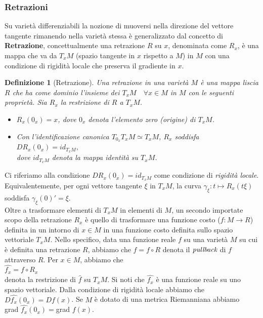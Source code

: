 \documentclass[a4paper, 12pt]{article}
\newtheorem{definition}{Definizione}
\begin{document}
\subsubsection{Retrazioni}
Su varietà differenziabili la nozione di muoversi nella direzione del vettore tangente rimanendo nella varietà stessa è generalizzato dal concetto di \textbf{Retrazione}, concettualmente una retrazione $R$ su $x$, denominata come $R_x$, è una mappa che va da $T_xM$ (spazio tangente in $x$ rispetto a $M$) in $M$ con una condizione di rigidità locale che preserva il gradiente in $x$.
\begin{definition}[Retrazione]
Una retrazione in una varietà $M$ è una mappa liscia $R$ che ha come dominio l'insieme dei $T_xM \quad \forall x \in M$ in $M$ con le seguenti proprietà. Sia $R_x$ la restrizione di $R$ a $T_xM$.
\begin{itemize}
  \item $R_x(0_x) = x$, dove $0_x$ denota l'elemento zero (origine) di $T_xM$.
  \item Con l'identificazione canonica $T_{0_x} T_xM \simeq T_xM$, $R_x$ soddisfa\\
  $DR_x(0_x) = id_{T_xM},$\\
  dove $id_{T_xM}$ denota la mappa identità su $T_xM$.
\end{itemize}
\end{definition}
Ci riferiamo alla condizione $DR_x(0_x) = id_{T_xM}$ come condizione di \emph{rigidità locale}. Equivalentemente, per ogni vettore tangente $\xi$ in $T_xM$, la curva $\gamma_{\xi}:t \mapsto R_x(t\xi)$ soddisfa $\gamma_{\xi}(0)' = \xi$.\\
Oltre a trasformare elementi di $T_xM$ in elementi di $M$, un secondo importate scopo della retrazione $R_x$ è quello di trasformare una funzione costo ($f:M \to R$) definita in un intorno di $x \in M$ in una funzione costo definita sullo spazio vettoriale $T_xM$. Nello specifico, data una funzione reale $f$ su una varietà $M$ su cui è definita una retrazione $R$, abbiamo che $\hat{f} = f \circ R$ denota il $\emph{pullback}$ di $f$ attraverso $R$. Per $x \in M$, abbiamo che\\
$\hat{f_x} = f \circ R_x$\\
denota la restrizione di $\hat{f}$ su $T_xM$. Si noti che $\hat{f_x}$ è una funzione reale su uno spazio vettoriale. Dalla condizione di rigidità locale abbiamo che $D\hat{f_x}(0_x) = Df(x)$. Se $M$ è dotato di una metrica Riemanniana abbiamo\\
grad $\hat{f_x}(0_x) =$grad $f(x)$.\\
\end{document}
